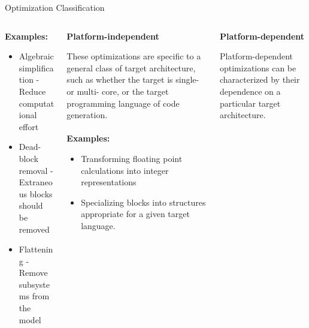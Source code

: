 \documentclass[final,hyperref={pdfpagelabels=false}]{beamer}
\begin{document}
\begin{frame}{}
\begin{block}{Optimization Classification}
\begin{columns}[t,totalwidth=\linewidth]
\begin{column}{.19\linewidth}
           \textbf{Examples:}
           
           \begin{itemize}
           \footnotesize
           \item Algebraic simplification - Reduce computational effort
           \item Dead-block removal - Extraneous blocks should be removed
           \item Flattening - Remove subsystems from the model
           \end{itemize}
           
           \end{column}
           \hspace{-1.2cm}\vrule\hspace{.05cm}
           \begin{column}{.19\linewidth}
           \small
          \begin{center}\textbf{Platform-independent}\end{center}
          \footnotesize
            These optimizations are specific to a general class
            of target architecture, such as whether the target is single- or multi- core, or the
            target programming language of code generation. \\~\\
                       
           \textbf{Examples:}
           
           \begin{itemize}
           \footnotesize
           \item Transforming floating point calculations into integer representations
           \item Specializing blocks into structures appropriate for a given target language.
           \end{itemize}
            \end{column}
            \hspace{-1.2cm}\vrule\hspace{.05cm}
            \begin{column}{.16\linewidth}
            \small
          \begin{center}\textbf{Platform-dependent}\end{center}
          \footnotesize
            Platform-dependent optimizations can be characterized by their dependence on a particular target
            architecture.\\~\\
                                   

\end{column}
\end{columns}
\end{block}
\end{frame}
\end{document}
